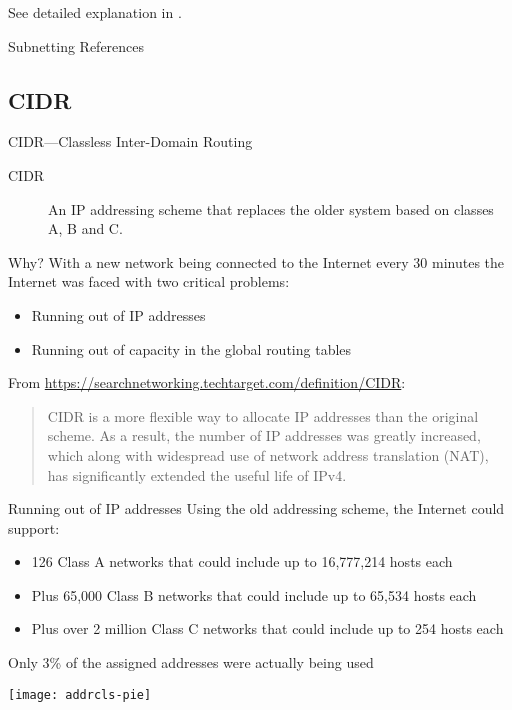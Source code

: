 See detailed explanation in .

\begin{frame}{Subnetting References}
  \begin{refsection}
    \nocite{wiki:subnet, wiki:ipv4subnetref,wiki:privatenet,rfc917,rfc950}
    \printbibliography[heading=none]
  \end{refsection}
\end{frame}

\subsection{CIDR}

\begin{frame}{CIDR---Classless Inter-Domain Routing}
  \begin{description}
  \item[CIDR] An IP addressing scheme that replaces the older system
    based on classes A, B and C.
  \end{description}
  \begin{iblock}{Why?}
    With a new network being connected to the Internet every 30 minutes the Internet was
    faced with two critical problems:
    \begin{itemize}
    \item Running out of IP addresses
    \item Running out of capacity in the global routing tables
    \end{itemize}
  \end{iblock}
\end{frame}

From \url{https://searchnetworking.techtarget.com/definition/CIDR}:
\begin{quote}
  CIDR is a more flexible way to allocate IP addresses than the original scheme. As a
  result, the number of IP addresses was greatly increased, which along with widespread
  use of network address translation (NAT), has significantly extended the useful life of
  IPv4.
\end{quote}

\begin{frame}{Running out of IP addresses}
  Using the old addressing scheme, the Internet could support:
  \begin{itemize}
  \item 126 Class A networks that could include up to 16,777,214 hosts each
  \item Plus 65,000 Class B networks that could include up to 65,534 hosts each
  \item Plus over 2 million Class C networks that could include up to 254 hosts each
  \end{itemize}
  \begin{minipage}{.65\linewidth}
    Only 3\% of the assigned addresses were actually being used
  \end{minipage}
  \begin{minipage}{.25\linewidth}
    \texttt{[image: addrcls-pie]}
  \end{minipage}  
\end{frame}

